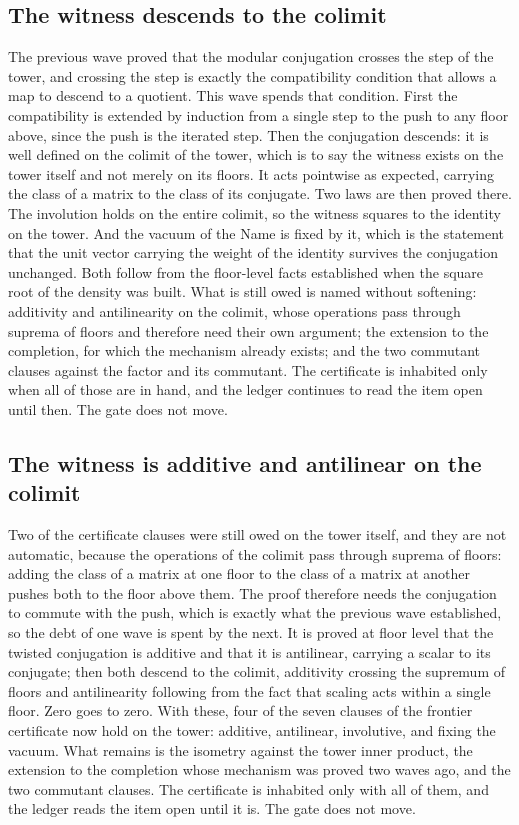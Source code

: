\documentclass[11pt]{article}
\theoremstyle{definition}\newtheorem{deriv}{Derivation}
\begin{document}
\subsection*{The witness descends to the colimit}The previous wave proved that the modular conjugation crosses the step of the tower, and crossing the step is exactly the compatibility condition that allows a map to descend to a quotient. This wave spends that condition. First the compatibility is extended by induction from a single step to the push to any floor above, since the push is the iterated step. Then the conjugation descends: it is well defined on the colimit of the tower, which is to say the witness exists on the tower itself and not merely on its floors. It acts pointwise as expected, carrying the class of a matrix to the class of its conjugate. Two laws are then proved there. The involution holds on the entire colimit, so the witness squares to the identity on the tower. And the vacuum of the Name is fixed by it, which is the statement that the unit vector carrying the weight of the identity survives the conjugation unchanged. Both follow from the floor-level facts established when the square root of the density was built. What is still owed is named without softening: additivity and antilinearity on the colimit, whose operations pass through suprema of floors and therefore need their own argument; the extension to the completion, for which the mechanism already exists; and the two commutant clauses against the factor and its commutant. The certificate is inhabited only when all of those are in hand, and the ledger continues to read the item open until then. The gate does not move.

\subsection*{The witness is additive and antilinear on the colimit}Two of the certificate clauses were still owed on the tower itself, and they are not automatic, because the operations of the colimit pass through suprema of floors: adding the class of a matrix at one floor to the class of a matrix at another pushes both to the floor above them. The proof therefore needs the conjugation to commute with the push, which is exactly what the previous wave established, so the debt of one wave is spent by the next. It is proved at floor level that the twisted conjugation is additive and that it is antilinear, carrying a scalar to its conjugate; then both descend to the colimit, additivity crossing the supremum of floors and antilinearity following from the fact that scaling acts within a single floor. Zero goes to zero. With these, four of the seven clauses of the frontier certificate now hold on the tower: additive, antilinear, involutive, and fixing the vacuum. What remains is the isometry against the tower inner product, the extension to the completion whose mechanism was proved two waves ago, and the two commutant clauses. The certificate is inhabited only with all of them, and the ledger reads the item open until it is. The gate does not move.
\end{document}
